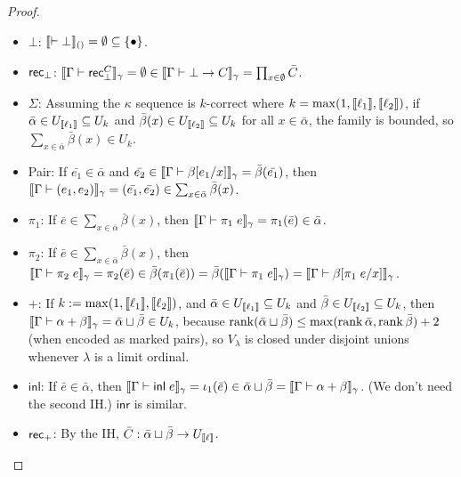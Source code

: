 \begin{proof}
\begin{itemize}
\begin{itemize}
\end{itemize}
\item $\bot$: $\llbracket \vdash\bot\rrbracket_{()}=\emptyset\subseteq\{\bullet\}$.
\item $\mathsf{rec}_\bot$: $\scott{\Gamma\vdash\rec^C_\bot}_\gamma=\emptyset\in\scott{\Gamma\vdash\bot\to C}_\gamma=\prod_{x\in\emptyset}\bar C$.
\item $\Sigma$: Assuming the $\kappa$ sequence is $k$-correct where $k=\max(1,\llbracket \ell_1\rrbracket,\llbracket \ell_2\rrbracket)$, if $\bar\alpha\in U_{\llbracket \ell_1\rrbracket}\subseteq U_k$ and $\bar\beta(x)\in U_{\llbracket \ell_2\rrbracket}\subseteq U_k$ for all $x\in \bar\alpha$, the family is bounded, so $\sum_{x\in\bar\alpha}\bar\beta(x)\in U_k$.
\item Pair: If $\bar{e_1}\in\bar\alpha$ and $\bar{e_2}\in \scott{\Gamma\vdash\beta[e_1/x]}_\gamma=\bar\beta(\bar{e_1})$, then $\scott{\Gamma\vdash(e_1,e_2)}_\gamma=(\bar{e_1},\bar{e_2})\in \sum_{x\in\bar\alpha}\bar\beta(x)$.
\item $\pi_1$: If $\bar e\in \sum_{x\in\bar\alpha}\bar\beta(x)$, then $\scott{\Gamma\vdash\pi_1\;e}_\gamma=\pi_1(\bar e)\in\bar\alpha$.
\item $\pi_2$: If $\bar e\in \sum_{x\in\bar\alpha}\bar\beta(x)$, then $\scott{\Gamma\vdash\pi_2\;e}_\gamma=\pi_2(\bar e)\in\bar\beta(\pi_1(\bar e))=\bar\beta(\scott{\Gamma\vdash\pi_1\;e}_\gamma)=\scott{\Gamma\vdash\beta[\pi_1\;e/x]}_\gamma$.
\item $+$: If $k:=\max(1,\llbracket \ell_1\rrbracket,\llbracket \ell_2\rrbracket)$, and $\bar\alpha\in U_{\llbracket \ell_1\rrbracket}\subseteq U_k$ and $\bar\beta\in U_{\llbracket \ell_2\rrbracket}\subseteq U_k$, then $\scott{\Gamma\vdash\alpha+\beta}_\gamma=\bar\alpha\sqcup\bar\beta\in U_k$, because $\operatorname{rank}(\bar\alpha\sqcup \bar\beta)\le\max(\operatorname{rank} \bar\alpha,\operatorname{rank} \bar\beta)+2$ (when encoded as marked pairs), so $V_\lambda$ is closed under disjoint unions whenever $\lambda$ is a limit ordinal.
\item $\mathsf{inl}$: If $\bar e\in\bar\alpha$, then $\scott{\Gamma\vdash\inl e}_\gamma=\iota_1(\bar e)\in\bar\alpha\sqcup\bar\beta=\scott{\Gamma\vdash\alpha+\beta}_\gamma$. (We don't need the second IH.) $\mathsf{inr}$ is similar.
\item $\mathsf{rec}_+$: By the IH, $\bar C:\bar\alpha\sqcup\bar\beta\to U_{\llbracket \ell\rrbracket}$.


\end{itemize}
\end{proof}
